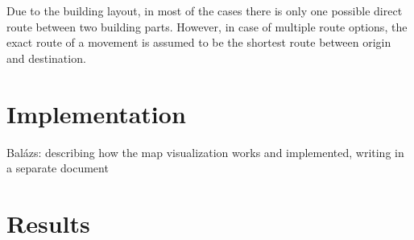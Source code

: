 Due to the building layout, in most of the cases there is only one possible
direct route between two building parts. However, in case of multiple route
options, the exact route of a movement is assumed to be the shortest route 
between origin and
destination.

\section{Implementation}
Balázs: describing how the map visualization works and implemented, writing in 
a separate document

\section{Results}

